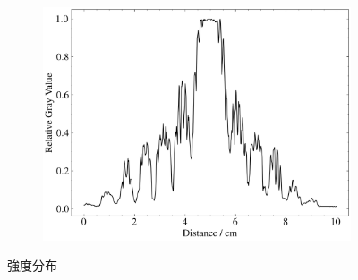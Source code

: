 \begin{figure}
	\addtocounter{figure}{-1}
	\begin{subfigure}{0.48\hsize}\centering
		\addtocounter{subfigure}{6}
		\includegraphics[width=\linewidth]{src/figures/result/ds3_data_amp.png}
		\label{subfig:ds3_amp}
	\end{subfigure}
	\caption{強度分布}\label{fig:amplitude}
\end{figure}
